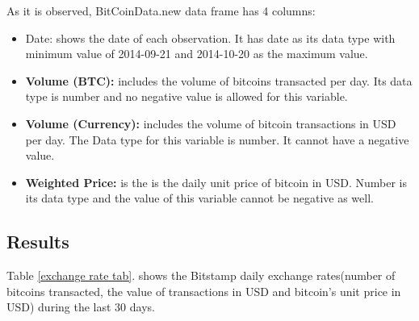 \documentclass{article}\usepackage[]{graphicx}\usepackage[]{color}
\begin{document}
As it is observed, BitCoinData.new data frame has 4 columns:
\begin{itemize}
  \item Date: shows the date of each observation. It has date as its data type with minimum value of 2014-09-21 and 2014-10-20 as the maximum value.
  \item \textbf{Volume (BTC):} includes the volume of bitcoins transacted per day. Its data type is number and no negative value is allowed for this variable.
   \item \textbf{Volume (Currency):} includes the volume of bitcoin transactions in USD per day. The Data type for this variable is number. It cannot have a negative value.
   \item \textbf{Weighted Price:} is the is the daily unit price of bitcoin in USD. Number is its data type and the value of this variable cannot be negative as well.
\end{itemize}
\subsection{Results}
Table \ref{exchange rate tab}. shows the Bitstamp daily exchange rates(number of bitcoins transacted, the value of transactions in USD and bitcoin's unit price in USD) during the last 30 days.\\
\end{document}
